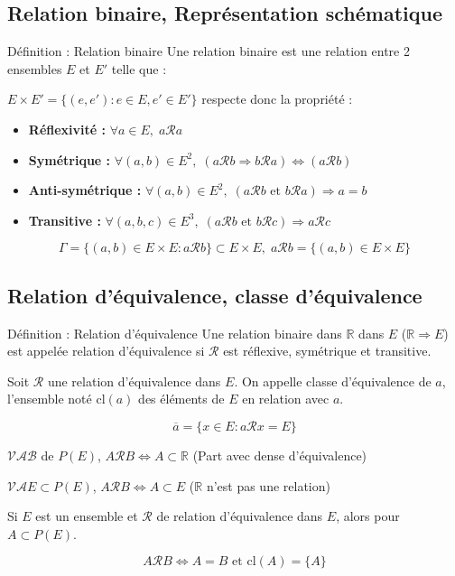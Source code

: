 \documentclass[a4paper,11pt]{article}
\begin{document}
\subsection{Relation binaire, Représentation schématique}

\begin{defbox}{Définition : Relation binaire}
Une relation binaire est une relation entre 2 ensembles $E$ et $E'$ telle que :

$E \times E' = \{(e, e') : e \in E, e' \in E'\}$ respecte donc la propriété :

\begin{itemize}
    \item \textbf{Réflexivité :} $\forall a \in E, \; a \mathcal{R} a$
    \item \textbf{Symétrique :} $\forall (a, b) \in E^2, \; (a \mathcal{R} b \Rightarrow b \mathcal{R} a) \Leftrightarrow (a \mathcal{R} b)$
    \item \textbf{Anti-symétrique :} $\forall (a, b) \in E^2, \; (a \mathcal{R} b \text{ et } b \mathcal{R} a) \Rightarrow a = b$
    \item \textbf{Transitive :} $\forall (a, b, c) \in E^3, \; (a \mathcal{R} b \text{ et } b \mathcal{R} c) \Rightarrow a \mathcal{R} c$
\end{itemize}

\[\Gamma = \{(a, b) \in E \times E : a \mathcal{R} b\} \subset E \times E, \; a \mathcal{R} b = \{(a, b) \in E \times E\}\]
\end{defbox}

\subsection{Relation d'équivalence, classe d'équivalence}

\begin{defbox}{Définition : Relation d'équivalence}
Une relation binaire dans $\mathbb{R}$ dans $E$ ($\mathbb{R} \Rightarrow E$) est appelée relation d'équivalence si $\mathcal{R}$ est réflexive, symétrique et transitive.

Soit $\mathcal{R}$ une relation d'équivalence dans $E$. On appelle classe d'équivalence de $a$, l'ensemble noté $\text{cl}(a)$ des éléments de $E$ en relation avec $a$.

\[\overline{a} = \{x \in E : a \mathcal{R} x = E\}\]

$\mathcal{VA} \mathcal{B}$ de $P(E)$, $A \mathcal{R} B \Leftrightarrow A \subset \mathbb{R}$ (Part avec dense d'équivalence)

$\mathcal{VA} E \subset P(E)$, $A \mathcal{R} B \Leftrightarrow A \subset E$ ($\mathbb{R}$ n'est pas une relation)

Si $E$ est un ensemble et $\mathcal{R}$ de relation d'équivalence dans $E$, alors pour $A \subset P(E)$.

\[A \mathcal{R} B \Leftrightarrow A = B \text{ et } \text{cl}(A) = \{A\}\]
\end{defbox}
\end{document}
